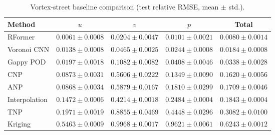 \begin{table}[t]
  \centering
  \caption{Vortex-street baseline comparison (test relative RMSE, mean $\pm$ std.).}
  \label{tab:rformer:vortex}
  \begin{tabular}{lcccc}
    \toprule
    Method & $u$ & $v$ & $p$ & Total \\
    \midrule
    RFormer       & $0.0061 \pm 0.0008$ & $0.0204 \pm 0.0047$ & $0.0101 \pm 0.0021$ & $\mathbf{0.0080 \pm 0.0014}$ \\
    Voronoi CNN   & $0.0138 \pm 0.0008$ & $0.0465 \pm 0.0025$ & $0.0244 \pm 0.0008$ & $0.0184 \pm 0.0008$ \\
    Gappy POD     & $0.0197 \pm 0.0018$ & $0.1082 \pm 0.0082$ & $0.0408 \pm 0.0046$ & $0.0338 \pm 0.0028$ \\
    CNP           & $0.0873 \pm 0.0031$ & $0.5606 \pm 0.0222$ & $0.1349 \pm 0.0090$ & $0.1620 \pm 0.0056$ \\
    ANP           & $0.0868 \pm 0.0034$ & $0.5879 \pm 0.0167$ & $0.1810 \pm 0.0299$ & $0.1709 \pm 0.0046$ \\
    Interpolation & $0.1472 \pm 0.0006$ & $0.4214 \pm 0.0018$ & $0.2484 \pm 0.0004$ & $0.1843 \pm 0.0004$ \\
    TNP           & $0.1971 \pm 0.0019$ & $0.8855 \pm 0.0469$ & $0.4448 \pm 0.0296$ & $0.3082 \pm 0.0100$ \\
    Kriging       & $0.5463 \pm 0.0009$ & $0.9968 \pm 0.0017$ & $0.9621 \pm 0.0061$ & $0.6243 \pm 0.0012$ \\
    \bottomrule
  \end{tabular}
\end{table}

